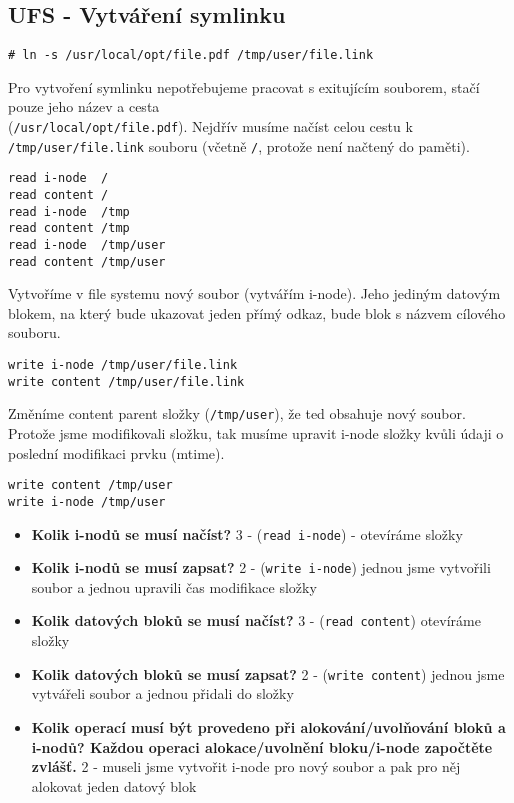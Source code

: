 \subsection{UFS - Vytváření symlinku}

\begin{verbatim}
# ln -s /usr/local/opt/file.pdf /tmp/user/file.link
\end{verbatim}

Pro vytvoření symlinku nepotřebujeme pracovat s exitujícím souborem, stačí pouze jeho název a cesta\\ (\texttt{/usr/local/opt/file.pdf}).
Nejdřív musíme načíst celou cestu k \texttt{/tmp/user/file.link} souboru (včetně \texttt{/}, protože není načtený do paměti).

\begin{verbatim}
read i-node  /
read content /
read i-node  /tmp
read content /tmp
read i-node  /tmp/user
read content /tmp/user
\end{verbatim}

Vytvoříme v file systemu nový soubor (vytvářím i-node). Jeho jediným datovým blokem, na který bude ukazovat jeden přímý odkaz, bude blok s názvem cílového souboru.
\begin{verbatim}
write i-node /tmp/user/file.link
write content /tmp/user/file.link
\end{verbatim}

Změníme content parent složky (\texttt{/tmp/user}), že ted obsahuje nový soubor. Protože jsme modifikovali složku, tak musíme upravit i-node složky kvůli údaji o poslední modifikaci prvku (mtime).
\begin{verbatim}
write content /tmp/user
write i-node /tmp/user
\end{verbatim}

\begin{itemize}
    \item 
        \textbf{Kolik i-nodů se musí načíst?} 3 
        - (\texttt{read i-node}) - otevíráme složky
    \item 
        \textbf{Kolik i-nodů se musí zapsat?} 2 
        - (\texttt{write i-node}) jednou jsme vytvořili soubor a jednou upravili čas modifikace složky
    \item 
        \textbf{Kolik datových bloků se musí načíst?} 3 
        - (\texttt{read content}) otevíráme složky
    \item
        \textbf{Kolik datových bloků se musí zapsat?} 2
        - (\texttt{write content}) jednou jsme vytvářeli soubor a jednou přidali do složky
    \item
        \textbf{Kolik operací musí být provedeno při alokování/uvolňování bloků a i-nodů? Každou operaci alokace/uvolnění bloku/i-node započtěte zvlášť.} 2
        - museli jsme vytvořit i-node pro nový soubor a pak pro něj alokovat jeden datový blok
\end{itemize}
